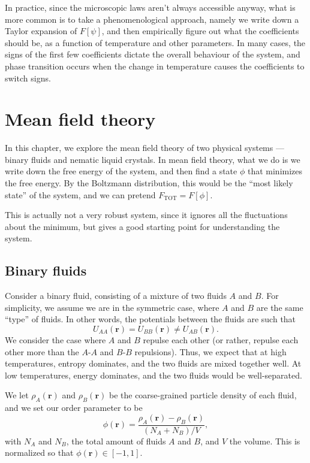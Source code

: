 \documentclass[a4paper]{article}
\begin{document}
In practice, since the microscopic laws aren't always accessible anyway, what is more common is to take a phenomenological approach, namely we write down a Taylor expansion of $F[\psi]$, and then empirically figure out what the coefficients should be, as a function of temperature and other parameters. In many cases, the signs of the first few coefficients dictate the overall behaviour of the system, and phase transition occurs when the change in temperature causes the coefficients to switch signs.

\section{Mean field theory}
In this chapter, we explore the mean field theory of two physical systems --- binary fluids and nematic liquid crystals. In mean field theory, what we do is we write down the free energy of the system, and then find a state $\phi$ that minimizes the free energy. By the Boltzmann distribution, this would be the ``most likely state'' of the system, and we can pretend $F_{\mathrm{TOT}} = F[\phi]$.

This is actually not a very robust system, since it ignores all the fluctuations about the minimum, but gives a good starting point for understanding the system.

\subsection{Binary fluids}
Consider a binary fluid, consisting of a mixture of two fluids $A$ and $B$. For simplicity, we assume we are in the symmetric case, where $A$ and $B$ are the same ``type'' of fluids. In other words, the potentials between the fluids are such that
\[
  U_{AA}(\mathbf{r}) = U_{BB}(\mathbf{r}) \not= U_{AB}(\mathbf{r}).
\]
We consider the case where $A$ and $B$ repulse each other (or rather, repulse each other more than the $A$-$A$ and $B$-$B$ repulsions). Thus, we expect that at high temperatures, entropy dominates, and the two fluids are mixed together well. At low temperatures, energy dominates, and the two fluids would be well-separated.

We let $\rho_A(\mathbf{r})$ and $\rho_B(\mathbf{r})$ be the coarse-grained particle density of each fluid, and we set our order parameter to be
\[
  \phi(\mathbf{r}) = \frac{\rho_A(\mathbf{r}) - \rho_B(\mathbf{r})}{(N_A + N_B)/V},
\]
with $N_A$ and $N_B$, the total amount of fluids $A$ and $B$, and $V$ the volume. This is normalized so that $\phi(\mathbf{r}) \in [-1, 1]$.
\end{document}
